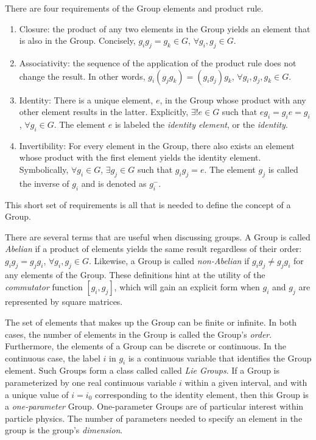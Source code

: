 There are four requirements of the Group elements and product rule.
\begin{enumerate}
    \item Closure: the product of any two elements in the Group yields an element that is also in the Group. Concisely, $g_ig_j=g_k\in G$, $\forall g_i,g_j\in G$.
    \item Associativity: the sequence of the application of the product rule does not change the result. In other words, $g_i(g_jg_k)=(g_ig_j)g_k$, $\forall g_i,g_j,g_k\in G$.
    \item Identity: There is a unique element, $e$, in the Group whose product with any other element results in the latter. Explicitly, $\exists!e\in G$ such that $eg_i=g_ie=g_i$, $\forall g_i\in G$. The element $e$ is labeled the \emph{identity element}, or the \emph{identity}.
    \item Invertibility: For every element in the Group, there also exists an element whose product with the first element yields the identity element. Symbolically, $\forall g_i\in G$, $\exists g_j\in G$ such that $g_ig_j=e$. The element $g_j$ is called the inverse of $g_i$ and is denoted as $g_i^{-}$.
\end{enumerate}
This short set of requirements is all that is needed to define the concept of a Group.

There are several terms that are useful when discussing groups.
A Group is called \emph{Abelian} if a product of elements yields the same result regardless of their order: $g_ig_j=g_jg_i$, $\forall g_i,g_j\in G$.
Likewise, a Group is called \emph{non-Abelian} if $g_ig_j\ne g_jg_i$ for any elements of the Group.
These definitions hint at the utility of the \emph{commutator} function $[g_i,g_j]$, which will gain an explicit form when $g_i$ and $g_j$ are represented by square matrices.

The set of elements that makes up the Group can be finite or infinite.
In both cases, the number of elements in the Group is called the Group's \emph{order}.
Furthermore, the elements of a Group can be discrete or continuous.
In the continuous case, the label $i$ in $g_i$ is a continuous variable that identifies the Group element.
Such Groups form a class called called \emph{Lie Groups}.
If a Group is parameterized by one real continuous variable $i$ within a given interval, and with a unique value of $i=i_0$ corresponding to the identity element, then this Group is a \emph{one-parameter} Group. 
One-parameter Groups are of particular interest within particle physics.
The number of parameters needed to specify an element in the group is the group's \emph{dimension}.

